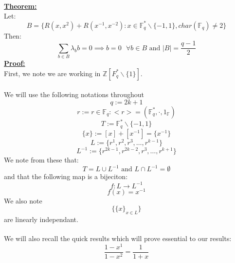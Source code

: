 \documentclass[11pt]{article}
\theoremstyle{plain}
\theoremstyle{definition}
\begin{document}
\textbf{\underline{Theorem:}}\\
Let:
\begin{equation*}
B = \{ R(x, x^2) + R(x^{-1},x^{-2}) : x \in \mathbb{F}_q ^* \backslash \{-1,1\}, char(\mathbb{F}_q) \neq 2 \} \end{equation*}
Then:
\begin{equation}
\sum_{b \in B} \lambda_b b = 0 \implies b=0 \text{ } \forall  b \in B \text{ and } |B| = \frac{q-1}{2}
\end{equation}
\textbf{\underline{Proof:}}\\
First, we note we are working in $\mathbb{Z} [F_q ^* \backslash \{1\} ]$.\\
\\
We will use the following notations throughout
\begin{equation*}
q:=2k+1
\end{equation*}
\begin{equation*}
r:= r \in \mathbb{F}_q : <r> = (\mathbb{F}_q ^*, \cdot, 1_\mathbb{F} )
\end{equation*}
\begin{equation*}
T := \mathbb{F}_q ^* \backslash \{-1,1\}
\end{equation*}
\begin{equation*}
\{x\} := [x] + [x^{-1}] = \{x^{-1}\}
\end{equation*}
\begin{equation*}
L:=\{r^1, r^2, r^3, \ldots, r^{k-1}\}
\end{equation*}
\begin{equation*}
L^{-1}:=\{r^{2k-1}, r^{2k-2}, r^3, \ldots, r^{k+1}\}
\end{equation*}
We note from these that:
\begin{equation*}
T= L \cup L^{-1} \text{ and } L \cap L^{-1} = \emptyset
\end{equation*}
and that the following map is a bijeciton:
\begin{equation*}
f: L \rightarrow L^{-1} 
\end{equation*}
\begin{equation*}
f(x) = x^{-1}
\end{equation*}
We also note
\begin{equation*}
\{\{x\}_{x \in L}\}
\end{equation*}
are linearly independant.\\
\\
We will also recall the quick results which will prove essential to our results:
\begin{equation*}
\frac{1-x^1}{1-x^2} = \frac{1}{1+x}
\end{equation*}
\end{document}
